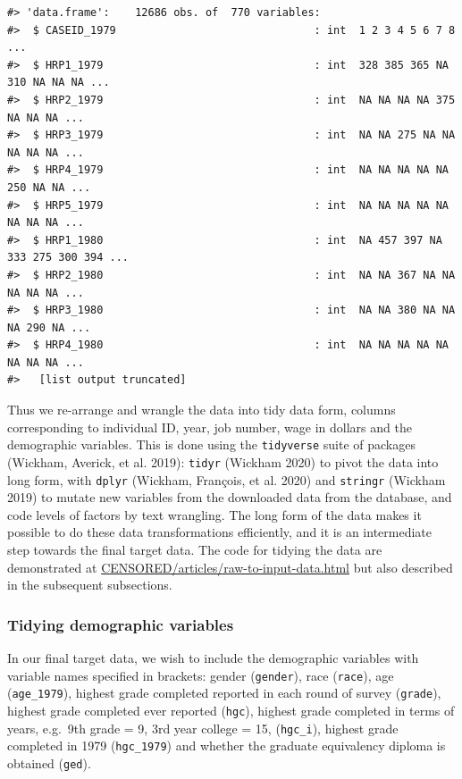 \documentclass{article}
\begin{document}
\begin{verbatim}
#> 'data.frame':    12686 obs. of  770 variables:
#>  $ CASEID_1979                               : int  1 2 3 4 5 6 7 8 ...
#>  $ HRP1_1979                                 : int  328 385 365 NA 310 NA NA NA ...
#>  $ HRP2_1979                                 : int  NA NA NA NA 375 NA NA NA ...
#>  $ HRP3_1979                                 : int  NA NA 275 NA NA NA NA NA ...
#>  $ HRP4_1979                                 : int  NA NA NA NA NA 250 NA NA ...
#>  $ HRP5_1979                                 : int  NA NA NA NA NA NA NA NA ...
#>  $ HRP1_1980                                 : int  NA 457 397 NA 333 275 300 394 ...
#>  $ HRP2_1980                                 : int  NA NA 367 NA NA NA NA NA ...
#>  $ HRP3_1980                                 : int  NA NA 380 NA NA NA 290 NA ...
#>  $ HRP4_1980                                 : int  NA NA NA NA NA NA NA NA ...
#>   [list output truncated]
\end{verbatim}

Thus we re-arrange and wrangle the data into tidy data form, columns corresponding to individual ID, year, job number, wage in dollars and the demographic variables. This is done using the \texttt{tidyverse} suite of packages (Wickham, Averick, et al. 2019): \texttt{tidyr} (Wickham 2020) to pivot the data into long form, with \texttt{dplyr} (Wickham, François, et al. 2020) and \texttt{stringr} (Wickham 2019) to mutate new variables from the downloaded data from the database, and code levels of factors by text wrangling. The long form of the data makes it possible to do these data transformations efficiently, and it is an intermediate step towards the final target data. The code for tidying the data are demonstrated at \url{CENSORED/articles/raw-to-input-data.html} but also described in the subsequent subsections.

\hypertarget{tidydemog}{%
\subsubsection{Tidying demographic variables}\label{tidydemog}}

In our final target data, we wish to include the demographic variables with variable names specified in brackets: gender (\texttt{gender}), race (\texttt{race}), age (\texttt{age\_1979}), highest grade completed reported in each round of survey (\texttt{grade}), highest grade completed ever reported (\texttt{hgc}), highest grade completed in terms of years, e.g.~9th grade = 9, 3rd year college = 15, (\texttt{hgc\_i}), highest grade completed in 1979 (\texttt{hgc\_1979}) and whether the graduate equivalency diploma is obtained (\texttt{ged}).
\end{document}
